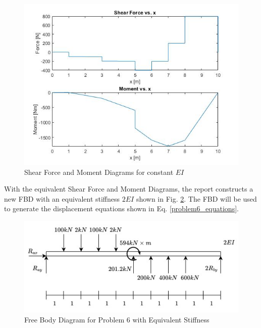\documentclass[a4paper]{article}
\begin{document}
\begin{figure}[h]
\includegraphics[width=\textwidth]{results/eq6.jpg}
\caption{Shear Force and Moment Diagrams for constant $EI$}
\label{eq6}
\end{figure}

With the equivalent Shear Force and Moment Diagrams, the report constructs a new FBD with an equivalent stiffness $2EI$ shown in Fig. \ref{FBD_6_new}. The FBD will be used to generate the displacement equations shown in Eq. \ref{problem6_equations}.

\begin{figure}[h]
\includegraphics[width=\textwidth]{FBD/FBD_6_new.jpg}
\caption{Free Body Diagram for Problem 6 with Equivalent Stiffness}
\label{FBD_6_new}
\end{figure}
\end{document}
